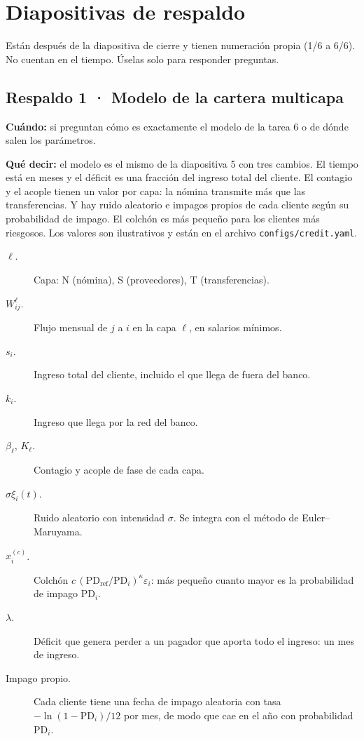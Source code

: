 \section{Diapositivas de respaldo}

Están después de la diapositiva de cierre y tienen numeración propia (1/6 a 6/6). No
cuentan en el tiempo. Úselas solo para responder preguntas.

\subsection*{Respaldo 1 · Modelo de la cartera multicapa}
\textbf{Cuándo:} si preguntan cómo es exactamente el modelo de la tarea 6 o de dónde
salen los parámetros.

\textbf{Qué decir:} el modelo es el mismo de la diapositiva 5 con tres cambios. El tiempo
está en meses y el déficit es una fracción del ingreso total del cliente. El contagio y
el acople tienen un valor por capa: la nómina transmite más que las transferencias. Y
hay ruido aleatorio e impagos propios de cada cliente según su probabilidad de impago.
El colchón es más pequeño para los clientes más riesgosos. Los valores son ilustrativos y
están en el archivo \texttt{configs/credit.yaml}.

\begin{terminos}
\begin{description}
\item[$\ell$.] Capa: N (nómina), S (proveedores), T (transferencias).
\item[$W^\ell_{ij}$.] Flujo mensual de $j$ a $i$ en la capa $\ell$, en salarios mínimos.
\item[$s_i$.] Ingreso total del cliente, incluido el que llega de fuera del banco.
\item[$k_i$.] Ingreso que llega por la red del banco.
\item[$\beta_\ell$, $K_\ell$.] Contagio y acople de fase de cada capa.
\item[$\sigma\xi_i(t)$.] Ruido aleatorio con intensidad $\sigma$. Se integra con el método
de Euler–Maruyama.
\item[$x_i^{(c)}$.] Colchón $c\,(\mathrm{PD}_\text{ref}/\mathrm{PD}_i)^\kappa\varepsilon_i$:
más pequeño cuanto mayor es la probabilidad de impago $\mathrm{PD}_i$.
\item[$\lambda$.] Déficit que genera perder a un pagador que aporta todo el ingreso: un
mes de ingreso.
\item[Impago propio.] Cada cliente tiene una fecha de impago aleatoria con tasa
$-\ln(1-\mathrm{PD}_i)/12$ por mes, de modo que cae en el año con probabilidad
$\mathrm{PD}_i$.
\end{description}
\end{terminos}

